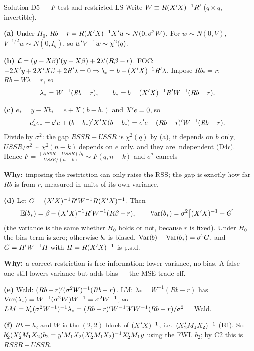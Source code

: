 \documentclass[11pt]{article}
\newcommand{\step}[1]{\par\smallskip\noindent\textbf{\textcolor{qnavy}{#1}}\quad\ignorespaces}
\newcommand{\Why}{\textbf{\textcolor{whyline}{Why:}}\ }
\begin{document}
\begin{solbox}{Solution D5 --- $F$ test and restricted LS}
Write $W \equiv R(X^{\prime} X)^{-1}R^{\prime}$ ($q \times q$, invertible).
\step{(a)} Under $H_{0}$, $Rb - r = R(X^{\prime} X)^{-1}X^{\prime} u \sim N(0, \sigma^{2}W)$. For
$w \sim N(0,V)$, $V^{-1/2}w \sim N(0,I_{q})$, so $w^{\prime} V^{-1}w \sim \chi^{2}(q)$.
\step{(b)} $\mathcal{L} = (y - X\beta)^{\prime}(y - X\beta) + 2\lambda^{\prime}(R\beta - r)$. FOC:
$-2X^{\prime} y + 2X^{\prime} X\beta + 2R^{\prime}\lambda = 0 \Rightarrow b_{*} = b - (X^{\prime} X)^{-1}R^{\prime}\lambda$.
Impose $Rb_{*} = r$: $Rb - W\lambda = r$, so
\[
  \lambda_{*} = W^{-1}(Rb - r), \qquad b_{*} = b - (X^{\prime} X)^{-1}R^{\prime} W^{-1}(Rb - r).
\]
\step{(c)} $e_{*} = y - Xb_{*} = e + X(b - b_{*})$ and $X^{\prime} e = 0$, so
\[
  e_{*}^{\prime} e_{*} = e^{\prime} e + (b - b_{*})^{\prime} X^{\prime} X(b - b_{*})
  = e^{\prime} e + (Rb - r)^{\prime} W^{-1}(Rb - r).
\]
Divide by $\sigma^{2}$: the gap $RSSR - USSR$ is $\chi^{2}(q)$ by (a), it depends on $b$ only,
$USSR/\sigma^{2} \sim \chi^{2}(n-k)$ depends on $e$ only, and they are independent (D4c). Hence
$F = \frac{(RSSR-USSR)/q}{USSR/(n-k)} \sim F(q, n-k)$ and $\sigma^{2}$ cancels.
\begin{why}\Why imposing the restriction can only raise the RSS; the gap is exactly
how far $Rb$ is from $r$, measured in units of its own variance.\end{why}
\step{(d)} Let $G = (X^{\prime} X)^{-1}R^{\prime} W^{-1}R(X^{\prime} X)^{-1}$. Then
\[
  \mathbb{E}(b_{*}) = \beta - (X^{\prime} X)^{-1}R^{\prime} W^{-1}(R\beta - r), \qquad
  \operatorname{Var}(b_{*}) = \sigma^{2}\big[(X^{\prime} X)^{-1} - G\big]
\]
(the variance is the same whether $H_{0}$ holds or not, because $r$ is fixed).
Under $H_{0}$ the bias term is zero; otherwise $b_{*}$ is biased. $\operatorname{Var}(b) - \operatorname{Var}(b_{*}) = \sigma^{2}G$,
and $G = H^{\prime} W^{-1}H$ with $H = R(X^{\prime} X)^{-1}$ is p.s.d.
\begin{why}\Why a correct restriction is free information: lower variance, no bias. A
false one still lowers variance but adds bias --- the MSE trade-off.\end{why}
\step{(e)} Wald: $(Rb - r)^{\prime}(\sigma^{2}W)^{-1}(Rb - r)$. LM: $\lambda_{*} = W^{-1}(Rb - r)$ has
$\operatorname{Var}(\lambda_{*}) = W^{-1}(\sigma^{2}W)W^{-1} = \sigma^{2}W^{-1}$, so
$LM = \lambda_{*}^{\prime}(\sigma^{2}W^{-1})^{-1}\lambda_{*} = (Rb - r)^{\prime} W^{-1}WW^{-1}(Rb - r)/\sigma^{2}$ = Wald.
\step{(f)} $Rb = b_{2}$ and $W$ is the $(2,2)$ block of $(X^{\prime} X)^{-1}$, i.e.\ $(X_{2}^{\prime} M_{1}X_{2})^{-1}$ (B1). So
$b_{2}^{\prime}(X_{2}^{\prime} M_{1}X_{2})b_{2} = y^{\prime} M_{1}X_{2}(X_{2}^{\prime} M_{1}X_{2})^{-1}X_{2}^{\prime} M_{1}y$ using the FWL $b_{2}$; by C2 this is $RSSR - USSR$.
\end{solbox}
\end{document}
